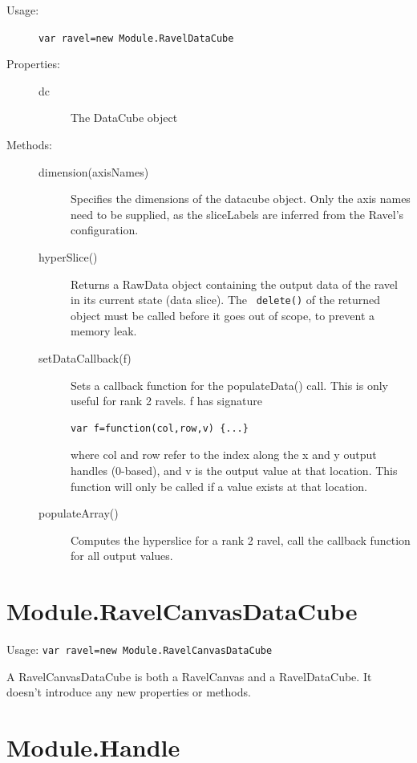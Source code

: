 \documentclass{article}
\begin{document}
\begin{description}
\item[Usage:] \verb+var ravel=new Module.RavelDataCube+

\item[Properties:]\mbox{}
\begin{description}
\item[dc] The DataCube object
\end{description}

\item[Methods:]\mbox{}
\begin{description}
\item[dimension(axisNames)]  Specifies the dimensions of the datacube
object. Only the axis names need to be supplied, as the sliceLabels
are inferred from the Ravel's configuration.
\item[hyperSlice()] Returns a RawData object containing the output
data of the ravel in its current state (data slice). The {\tt
delete()} of the returned object must be called before it goes out of
scope, to prevent a memory leak. 
\item[setDataCallback(f)] Sets a callback function for the
populateData() call. This is only useful for rank 2 ravels. f has
signature
\begin{verbatim}
var f=function(col,row,v) {...}
\end{verbatim}
where col and row refer to the index along the x and y output handles
(0-based), and v is the output value at that location. This function
will only be called if a value exists at that location.
\item[populateArray()] Computes the hyperslice for a rank 2 ravel,
call the callback function for all output values.

\end{description}
\end{description}

\section{Module.RavelCanvasDataCube}

Usage: \verb+var ravel=new Module.RavelCanvasDataCube+

A RavelCanvasDataCube is both a RavelCanvas and a RavelDataCube. It
doesn't introduce any new properties or methods.

\section{Module.Handle}
\end{document}

